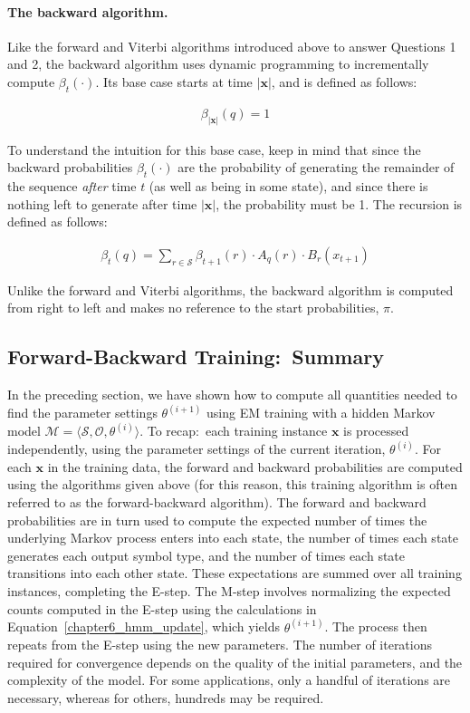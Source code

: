 \paragraph{\bf The backward algorithm.}
Like the forward and Viterbi algorithms introduced above to answer
Questions 1 and 2, the backward algorithm uses dynamic programming to
incrementally compute $\beta_t(\cdot)$.  Its base case starts at time
$|\textbf{x}|$, and is defined as follows:

\label{chapter6_backward}

\begin{eqnarray*}
\beta_{|\textbf{x}|}(q) = 1
\end{eqnarray*}

\noindent To understand the intuition for this base case, keep in mind
that since the backward probabilities $\beta_t(\cdot)$ are the
probability of generating the remainder of the sequence \emph{after}
time $t$ (as well as being in some state), and since there is nothing
left to generate after time $|\textbf{x}|$, the probability must be 1.
The recursion is defined as follows:

\begin{eqnarray*}
\beta_{t}(q) = \sum_{r \in \mathcal{S}} \beta_{t+1}(r) \cdot A_q(r) \cdot B_r(x_{t+1})
\end{eqnarray*}

\noindent Unlike the forward and Viterbi algorithms, the backward
algorithm is computed from right to left and makes no reference to the
start probabilities, $\pi$.

\subsection{Forward-Backward Training:\ Summary} 

In the preceding section, we have shown how to compute all quantities
needed to find the parameter settings $\theta^{(i+1)}$ using EM
training with a hidden Markov model $\mathcal{M}=\langle
\mathcal{S},\mathcal{O}, \theta^{(i)} \rangle$.  To recap:\ each
training instance $\textbf{x}$ is processed independently, using the
parameter settings of the current iteration, $\theta^{(i)}$. For each
$\textbf{x}$ in the training data, the forward and backward
probabilities are computed using the algorithms given above (for this
reason, this training algorithm is often referred to as the
forward-backward algorithm).  The forward and backward probabilities
are in turn used to compute the expected number of times the
underlying Markov process enters into each state, the number of times
each state generates each output symbol type, and the number of times
each state transitions into each other state.  These expectations are
summed over all training instances, completing the E-step.  The M-step
involves normalizing the expected counts computed in the E-step using
the calculations in Equation~\ref{chapter6_hmm_update}, which yields
$\theta^{(i+1)}$.  The process then repeats from the E-step using the
new parameters.  The number of iterations required for convergence
depends on the quality of the initial parameters, and the complexity
of the model.  For some applications, only a handful of iterations are
necessary, whereas for others, hundreds may be required.

